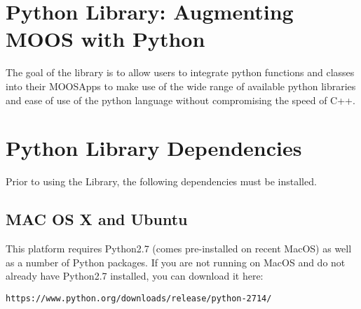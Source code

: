 \documentclass[onecolumn,letterpaper,11pt]{article}
\begin{document}
	
	\begin{labcover}
		\vspace{0.1in}
		\vspace{0.1in}
	\end{labcover}
	
	
	\section{Python Library: Augmenting MOOS with Python}
	\label{libPython}
	
	The goal of the  library is to allow users to integrate python functions and classes into their MOOSApps to make use of the wide range of available python libraries and ease of use of the python language without compromising the speed of C++. 
	
	\section{Python Library Dependencies}
	
	Prior to using the  Library, the following dependencies must be installed.
	
	\subsection{MAC OS X and Ubuntu}
	
	This platform requires Python2.7 (comes pre-installed on recent MacOS) as well
	as a number of Python packages. If you are not running on MacOS and do not
	already have Python2.7 installed, you can download it here:
	
	\begin{center}
	\vspace{0.15in}
	\texttt{https://www.python.org/downloads/release/python-2714/}
	\vspace{0.15in}
	\end{center}
\end{document}
